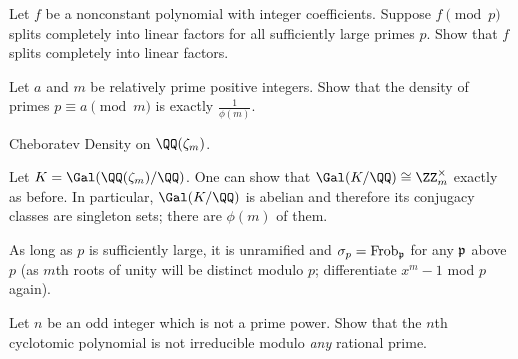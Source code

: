 \begin{problem}
	Let $f$ be a nonconstant polynomial with integer coefficients.
	Suppose $f \pmod p$ splits completely into linear factors
	for all sufficiently large primes $p$.
	Show that $f$ splits completely into linear factors.
\end{problem}

\begin{dproblem}
	Let $a$ and $m$ be relatively prime positive integers.
	Show that the density of primes $p \equiv a \pmod m$ is exactly $\frac{1}{\phi(m)}$.
	\begin{hint}
		Cheboratev Density on $\QQ(\zeta_m)$.
	\end{hint}
	\begin{sol}
		Let $K = \Gal(\QQ(\zeta_m)/\QQ)$.
		One can show that $\Gal(K/\QQ) \cong \Zm m$ exactly as before.
		In particular, $\Gal(K/\QQ)$ is abelian and therefore its conjugacy classes
		are singleton sets; there are $\phi(m)$ of them.

		As long as $p$ is sufficiently large, it is unramified
		and $\sigma_p = \mathrm{Frob}_\mathfrak p$ for any $\mathfrak p$ above $p$
		(as $m$th roots of unity will be distinct modulo $p$;
		differentiate $x^m-1$ mod $p$ again).
	\end{sol}
\end{dproblem}

\begin{problem}
	Let $n$ be an odd integer which is not a prime power.
	Show that the $n$th cyclotomic polynomial is not
	irreducible modulo \emph{any} rational prime.
\end{problem}
